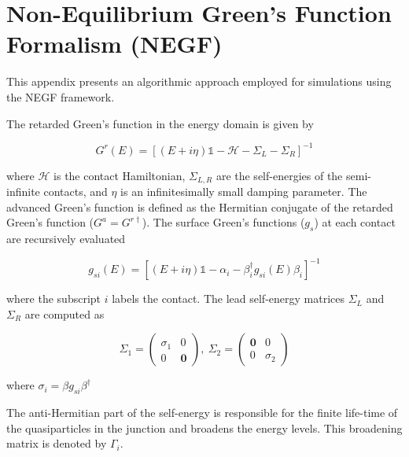 \chapter{Non-Equilibrium Green's Function Formalism (NEGF)}

This appendix presents an algorithmic approach employed for simulations using the NEGF framework. \par

The retarded Green's function in the energy domain is given by

\begin{equation}
	G^{r}(E) = [(E+i\eta)\mathds{1}-\mathcal{H}-\Sigma_{L}-\Sigma_{R}]^{-1}
\end{equation}

where $\mathcal{H}$ is the contact Hamiltonian, $\Sigma_{L,R}$ are the self-energies of the semi-infinite contacts, and $\eta$ is an infinitesimally small damping parameter. The advanced Green's function is defined as the Hermitian conjugate of the retarded Green's function ($G^{a} = G^{r\dagger}$). The surface Green's functions ($g_{s}$) at each contact are recursively evaluated 

\begin{equation}
	g_{si}(E) = [(E+i\eta)\mathds{1}-\alpha_{i}-\beta^{\dagger}_{i}g_{si}(E)\beta_{i}]^{-1}
\end{equation}

where the subscript $i$ labels the contact. The lead self-energy matrices $\Sigma_{L}$ and $\Sigma_{R}$ are computed as 

\begin{equation}
    \Sigma_{1} = 
    \begin{pmatrix} 
        \sigma_1 & 0 \\ 
        0 & \mathbf{0}
    \end{pmatrix} , \:
    \Sigma_{2} = 
    \begin{pmatrix}
        \mathbf{0} & 0 \\ 
        0 & \sigma_{2}
    \end{pmatrix}
\end{equation}

where $\sigma_{i} = \beta g_{si}\beta^{\dagger}$ \par

The anti-Hermitian part of the self-energy is responsible for the finite life-time of the quasiparticles in the junction and broadens the energy levels. This broadening matrix is denoted by $\Gamma_{i}$. \par


